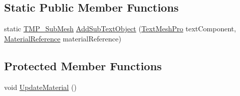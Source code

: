 \subsection*{Static Public Member Functions}
\begin{DoxyCompactItemize}
\item 
static \mbox{\hyperlink{class_t_m_pro_1_1_t_m_p___sub_mesh}{T\+M\+P\+\_\+\+Sub\+Mesh}} \mbox{\hyperlink{class_t_m_pro_1_1_t_m_p___sub_mesh_aab11f751e99fd3566e382584cc334a4d}{Add\+Sub\+Text\+Object}} (\mbox{\hyperlink{class_t_m_pro_1_1_text_mesh_pro}{Text\+Mesh\+Pro}} text\+Component, \mbox{\hyperlink{struct_t_m_pro_1_1_material_reference}{Material\+Reference}} material\+Reference)
\end{DoxyCompactItemize}
\subsection*{Protected Member Functions}
\begin{DoxyCompactItemize}
\item 
void \mbox{\hyperlink{class_t_m_pro_1_1_t_m_p___sub_mesh_a36148dca95029b37eed7ad450024d886}{Update\+Material}} ()
\end{DoxyCompactItemize}
